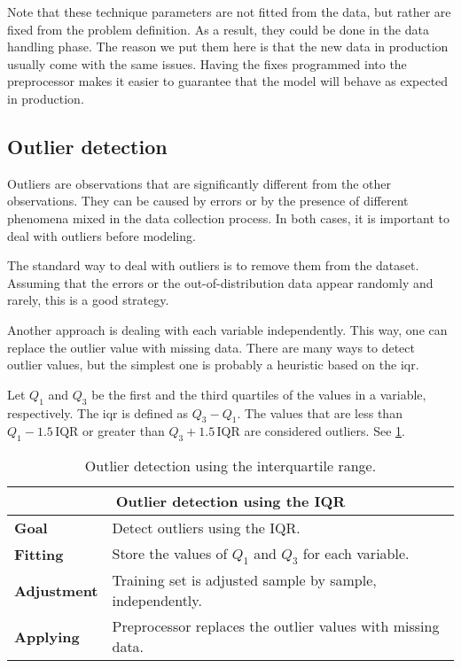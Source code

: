 Note that these technique parameters are not fitted from the data, but rather are fixed
from the problem definition.  As a result, they could be done in the data handling phase.
The reason we put them here is that the new data in production usually come with the
same issues.  Having the fixes programmed into the preprocessor makes it easier to
guarantee that the model will behave as expected in production.

\subsection{Outlier detection}

Outliers are observations that are significantly different from the other observations.
They can be caused by errors or by the presence of different phenomena mixed in the data
collection process.  In both cases, it is important to deal with outliers before modeling.

The standard way to deal with outliers is to remove them from the dataset.  Assuming that
the errors or the out-of-distribution data appear randomly and rarely, this is a good
strategy.

Another approach is dealing with each variable independently.  This way, one can replace
the outlier value with missing data.  There are many ways to detect outlier values, but
the simplest one is probably a heuristic based on the \gls{iqr}.

Let $Q_1$ and $Q_3$ be the first and the third quartiles of the values in a variable,
respectively.  The \gls{iqr} is defined as $Q_3 - Q_1$.  The values that are less than
$Q_1 - 1.5\, \text{IQR}$ or greater than $Q_3 + 1.5\, \text{IQR}$ are considered outliers.
See \cref{tab:iqr-outlier}.

\begin{table}\caption{Outlier detection using the interquartile range.}
  \centering
  \begin{tabular}{lp{6cm}}
    \toprule
    \multicolumn{2}{c}{\textbf{Outlier detection using the IQR}} \\
    \midrule
    \textbf{Goal} &
      Detect outliers using the IQR. \\
    \textbf{Fitting} &
      Store the values of $Q_1$ and $Q_3$ for each variable. \\
    \textbf{Adjustment} &
      Training set is adjusted sample by sample, independently. \\
    \textbf{Applying} &
      Preprocessor replaces the outlier values with missing data. \\
    \bottomrule
  \end{tabular}
  \label{tab:iqr-outlier}
\end{table}


